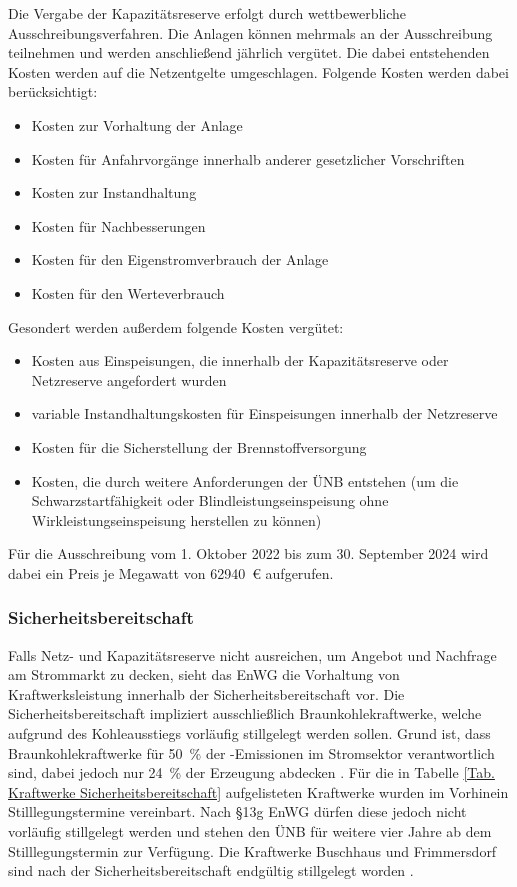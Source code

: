 			Die Vergabe der Kapazitätsreserve erfolgt durch wettbewerbliche Ausschreibungsverfahren.
			Die Anlagen können mehrmals an der Ausschreibung teilnehmen und werden anschließend jährlich vergütet.
			Die dabei entstehenden Kosten werden auf die Netzentgelte umgeschlagen. 
			Folgende Kosten werden dabei berücksichtigt: 
			\begin{itemize}
				\item Kosten zur Vorhaltung der Anlage
				\item Kosten für Anfahrvorgänge innerhalb anderer gesetzlicher Vorschriften
				\item Kosten zur Instandhaltung
				\item Kosten für Nachbesserungen
				\item Kosten für den Eigenstromverbrauch der Anlage
				\item Kosten für den Werteverbrauch
			\end{itemize}
			Gesondert werden außerdem folgende Kosten vergütet:
			\begin{itemize}
				\item Kosten aus Einspeisungen, die innerhalb der Kapazitätsreserve oder Netzreserve angefordert wurden
				\item variable Instandhaltungskosten für Einspeisungen innerhalb der Netzreserve
				\item Kosten für die Sicherstellung der Brennstoffversorgung 
				\item Kosten, die durch weitere Anforderungen der ÜNB entstehen (um die Schwarzstartfähigkeit oder Blindleistungseinspeisung ohne Wirkleistungseinspeisung herstellen zu können)
			\end{itemize}
			Für die Ausschreibung vom 1. Oktober 2022 bis zum 30. September 2024 wird dabei ein Preis je Megawatt von \SI{62940}{\euro} aufgerufen.
		
		\subsubsection{Sicherheitsbereitschaft}
		
			Falls Netz- und Kapazitätsreserve nicht ausreichen, um Angebot und Nachfrage am Strommarkt zu decken, sieht das EnWG die Vorhaltung von Kraftwerksleistung innerhalb der Sicherheitsbereitschaft vor.
			Die Sicherheitsbereitschaft impliziert ausschließlich Braunkohlekraftwerke, welche aufgrund des Kohleausstiegs vorläufig stillgelegt werden sollen.
			Grund ist, dass Braunkohlekraftwerke für \SI{50}{\percent} der \COO-Emissionen im Stromsektor verantwortlich sind, dabei jedoch nur \SI{24}{\percent} der Erzeugung abdecken \cite{Agora_Braunkohle}.		
			Für die in Tabelle \ref{Tab. Kraftwerke Sicherheitsbereitschaft} aufgelisteten Kraftwerke wurden im Vorhinein Stilllegungstermine vereinbart.
			Nach §13g EnWG dürfen diese jedoch nicht vorläufig stillgelegt werden und stehen den ÜNB für weitere vier Jahre ab dem Stilllegungstermin zur Verfügung.
			Die Kraftwerke Buschhaus und Frimmersdorf sind nach der Sicherheitsbereitschaft endgültig stillgelegt worden \cite{EnWG}.  
		
